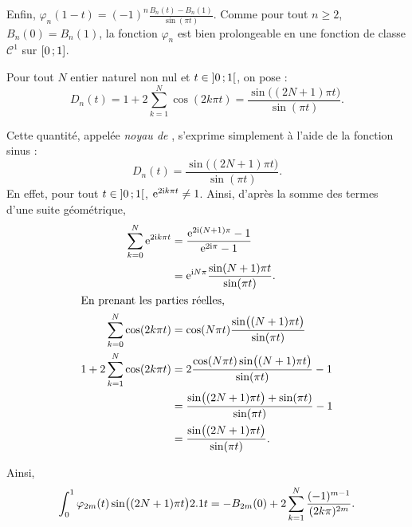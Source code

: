 \begin{elemsolution}
\begin{reponses}
\begin{itemize}
Enfin, $\varphi_n(1-t) = (-1)^n \frac{B_n(t) - B_n(1)}{\sin(\pi t)}$. Comme pour tout $n \geqslant 2$, $B_n(0) = B_n(1)$, la fonction $\varphi_n$ est bien prolongeable en une fonction de classe $\mathscr{C}^1$ sur $\left[0\,;1\right]$.
\end{itemize}
\end{reponses}

Pour tout $N$ entier naturel non nul et $t \in \left]0\,;1\right[$, on pose :
\[
D_n(t) = 1 + 2 \sum_{k=1}^N \cos(2k \pi t) = \frac{\sin\mathopen{}\big((2N+1) \pi t \big)}{\sin(\pi t)}.
\]

\begin{reponses}[resume]
\item Cette quantité, appelée \textsl{noyau de }, s'exprime simplement à l'aide de la fonction sinus :
\[
D_n(t) = \frac{\sin\mathopen{}\big((2N+1) \pi t \big)}{\sin(\pi t)}.
\]
En effet, pour tout $t \in \left]0\,;1\right[$, $\mathrm{e}^{2 \mathrm{i} k \pi t} \not= 1$. Ainsi, d'après la somme des termes d'une suite géométrique, 
    \begin{align*}
        \sum_{k=0}^N \mathrm{e}^{2 \mathrm{i} k \pi t} &= \frac{\mathrm{e}^{2 \mathrm{i} (N+1) \pi} - 1}{\mathrm{e}^{2 \mathrm{i} \pi} - 1} \\
        &= \mathrm{e}^{\mathrm{i} N \pi} \frac{\sin(N+1) \pi t}{\sin(\pi t)}. \\
        \intertext{En prenant les parties réelles,}
        \sum_{k=0}^N \cos(2 k \pi t) &= \cos(N \pi t) \frac{\sin\mathopen{}\big((N+1) \pi t \big)}{\sin(\pi t)} \\
        1 + 2 \sum_{k=1}^N \cos(2 k \pi t) &= 2 \frac{\cos(N \pi t) \sin\mathopen{}\big((N+1) \pi t\big)}{\sin(\pi t)} - 1 \\
        &= \frac{\sin\mathopen{}\big((2N+1) \pi t \big) + \sin( \pi t)}{\sin(\pi t)} - 1 \\
        &= \frac{\sin\mathopen{}\big((2N+1) \pi t \big)}{\sin(\pi t)}.
    \end{align*}

\item 
\begin{reponses}
    \item Ainsi,
\[
\int_0^1 \varphi_{2m}(t) \sin\mathopen{}\big((2N+1) \pi t \big) 2.1 t
= - B_{2m}(0) + 2 \sum_{k=1}^N \frac{(-1)^{m-1}}{(2 k \pi)^{2m}}.
\]


\end{reponses}
\end{reponses}
\end{elemsolution}
